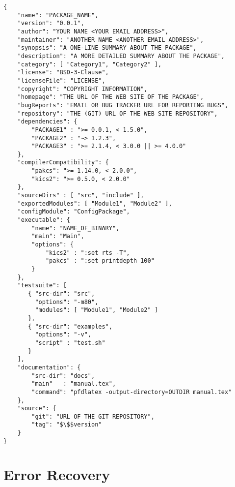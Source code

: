 \documentclass[11pt]{article}
\begin{document}
\begin{lstlisting}
{
    "name": "PACKAGE_NAME",
    "version": "0.0.1",
    "author": "YOUR NAME <YOUR EMAIL ADDRESS>",
    "maintainer": "ANOTHER NAME <ANOTHER EMAIL ADDRESS>",
    "synopsis": "A ONE-LINE SUMMARY ABOUT THE PACKAGE",
    "description": "A MORE DETAILED SUMMARY ABOUT THE PACKAGE",
    "category": [ "Category1", "Category2" ],
    "license": "BSD-3-Clause",
    "licenseFile": "LICENSE",
    "copyright": "COPYRIGHT INFORMATION",
    "homepage": "THE URL OF THE WEB SITE OF THE PACKAGE",
    "bugReports": "EMAIL OR BUG TRACKER URL FOR REPORTING BUGS",
    "repository": "THE (GIT) URL OF THE WEB SITE REPOSITORY",
    "dependencies": {
        "PACKAGE1" : ">= 0.0.1, < 1.5.0",
        "PACKAGE2" : "~> 1.2.3",
        "PACKAGE3" : ">= 2.1.4, < 3.0.0 || >= 4.0.0"
    },
    "compilerCompatibility": {
        "pakcs": ">= 1.14.0, < 2.0.0",
        "kics2": ">= 0.5.0, < 2.0.0"
    },
    "sourceDirs" : [ "src", "include" ],
    "exportedModules": [ "Module1", "Module2" ],
    "configModule": "ConfigPackage",
    "executable": {
        "name": "NAME_OF_BINARY",
        "main": "Main",
        "options": {
            "kics2" : ":set rts -T",
            "pakcs" : ":set printdepth 100"
        }
    },
    "testsuite": [
       { "src-dir": "src",
         "options": "-m80",
         "modules": [ "Module1", "Module2" ]
       },
       { "src-dir": "examples",
         "options": "-v",
         "script" : "test.sh"
       }
    ],
    "documentation": {
        "src-dir": "docs",
        "main"   : "manual.tex",
        "command": "pfdlatex -output-directory=OUTDIR manual.tex"
    },
    "source": {
        "git": "URL OF THE GIT REPOSITORY",
        "tag": "$\$$version"
    }
}
\end{lstlisting}


\clearpage

\section{Error Recovery}
\label{sec:recovery}
\end{document}
